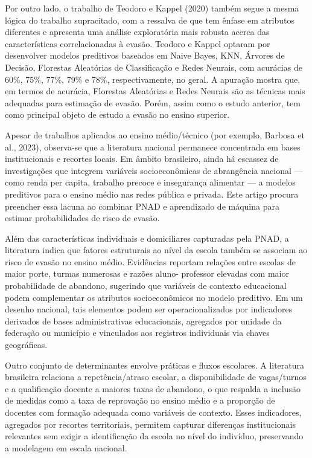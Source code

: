 \documentclass[english, spanish, brazilian]{RBIEarticle} %
\begin{document}
Por outro lado, o trabalho de Teodoro e Kappel (2020) também segue a mesma lógica do
trabalho supracitado, com a ressalva de que tem ênfase em atributos diferentes e apresenta uma
análise exploratória mais robusta acerca das características correlacionadas à evasão. Teodoro e
Kappel optaram por desenvolver modelos preditivos baseados em Naive Bayes, KNN, Árvores de
Decisão, Florestas Aleatórias de Classificação e Redes Neurais, com acurácias de 60\%, 75\%,
77\%, 79\% e 78\%, respectivamente, no geral. A apuração mostra que, em termos de acurácia,
Florestas Aleatórias e Redes Neurais são as técnicas mais adequadas para estimação de evasão.
Porém, assim como o estudo anterior, tem como principal objeto de estudo a evasão no ensino
superior.

Apesar de trabalhos aplicados ao ensino médio/técnico (por exemplo, Barbosa et al., 2023),
observa-se que a literatura nacional permanece concentrada em bases institucionais e recortes
locais. Em âmbito brasileiro, ainda há escassez de investigações que integrem variáveis
socioeconômicas de abrangência nacional — como renda per capita, trabalho precoce e insegurança
alimentar — a modelos preditivos para o ensino médio nas redes pública e privada. Este artigo
procura preencher essa lacuna ao combinar PNAD e aprendizado de máquina para estimar
probabilidades de risco de evasão.

Além das características individuais e domiciliares capturadas pela PNAD, a literatura indica que
fatores estruturais ao nível da escola também se associam ao risco de evasão no ensino médio.
Evidências reportam relações entre escolas de maior porte, turmas numerosas e razões aluno-
professor elevadas com maior probabilidade de abandono, sugerindo que variáveis de contexto
educacional podem complementar os atributos socioeconômicos no modelo preditivo. Em um
desenho nacional, tais elementos podem ser operacionalizados por indicadores derivados de bases
administrativas educacionais, agregados por unidade da federação ou município e vinculados aos
registros individuais via chaves geográficas.

Outro conjunto de determinantes envolve práticas e fluxos escolares. A literatura brasileira
relaciona a repetência/atraso escolar, a disponibilidade de vagas/turnos e a qualificação docente a
maiores taxas de abandono, o que respalda a inclusão de medidas como a taxa de reprovação no
ensino médio e a proporção de docentes com formação adequada como variáveis de contexto. Esses
indicadores, agregados por recortes territoriais, permitem capturar diferenças institucionais
relevantes sem exigir a identificação da escola no nível do indivíduo, preservando a modelagem em
escala nacional.
\end{document}
